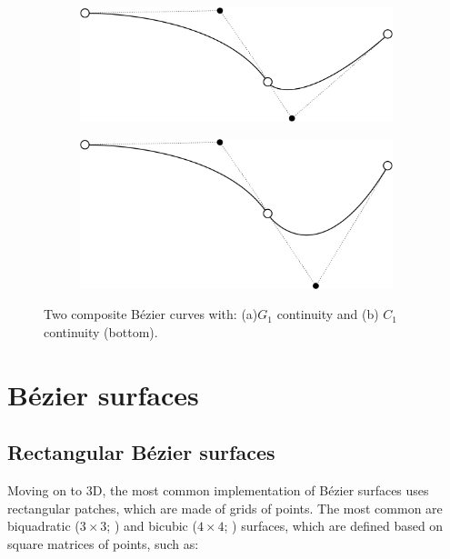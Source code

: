 \begin{figure}
\centering
\begin{subfigure}{0.5\linewidth}
\includegraphics[width=\linewidth]{figs/polybezierg}
\caption{}%
\label{subfig:polybezierg}
\end{subfigure}%
\begin{subfigure}{0.5\linewidth}
\includegraphics[width=\linewidth]{figs/polybezierc}
\caption{}%
\label{subfig:polybezierc}
\end{subfigure}%
\caption{Two composite B\'ezier curves with: (a)\(G_1\) continuity and (b) \(C_1\) continuity (bottom).}%
\label{fig:polybezier}
\end{figure}

\section{B\'ezier surfaces}
\subsection{Rectangular B\'ezier surfaces}

Moving on to 3D, the most common implementation of B\'ezier surfaces uses rectangular patches, which are made of grids of points.
The most common are biquadratic (\(3 \times 3\); ) and bicubic (\(4 \times 4\); ) surfaces, which are defined based on square matrices of points, such as:

